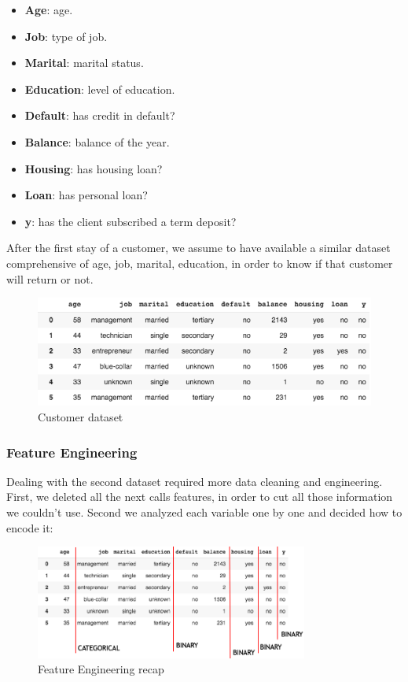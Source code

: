 \begin{itemize}
\item \textbf{Age}: age.
\item \textbf{Job}: type of job.
\item \textbf{Marital}: marital status.
\item \textbf{Education}: level of education.
\item \textbf{Default}: has credit in default?
\item \textbf{Balance}: balance of the year.
\item \textbf{Housing}: has housing loan?
\item \textbf{Loan}: has personal loan?
\item \textbf{y}: has the client subscribed a term deposit?
\end{itemize}

\noindent After the first stay of a customer, we assume to have available a similar dataset comprehensive of age, job, marital, education, in order to know if that customer will return or not.

\begin{figure}[H]
\centering
\includegraphics[width=1\textwidth]{Img/bank_dataset.png}
\caption{Customer dataset}
\end{figure}

\clearpage
\subsubsection{Feature Engineering}
Dealing with the second dataset required more data cleaning and engineering. First, we deleted all the next calls features, in order to cut all those information we couldn't use. Second we analyzed each variable one by one and decided how to encode it:
\begin{figure}[H]
\centering
\includegraphics[width=0.8\textwidth]{Img/feature_recap.png}
\caption{Feature Engineering recap}
\end{figure}

